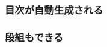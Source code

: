 \documentclass[dvipdfmx]{beamer}
\begin{document}
\frame[plain]{\maketitle}

\begin{frame}{}
  \frametitle{目次が自動生成される}
  \tableofcontents
\end{frame}

\begin{frame}{}
  \frametitle{段組もできる}
    \begin{multicols}{2}
      \tableofcontents[sections={1}]
      \columnbreak
      \tableofcontents[sections={2-3}]
    \end{multicols}
\end{frame}




\end{document}
